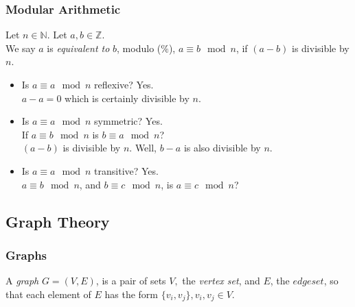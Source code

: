 \documentclass{article}
\newcommand{\N}{\ensuremath{\mathbb{N}}}
\newcommand{\Z}{\ensuremath{\mathbb{Z}}}
\begin{document}
        \subsubsection{Modular Arithmetic}
            \begin{definition}
                Let $n\in \N.$ Let $a,b\in \Z.$ \\
                We say $a$ is \textit{equivalent to} $b$, modulo ($\%$), $a \equiv b \mod{n}$, if $(a-b)$ is divisible by $n$.
            \end{definition}
        
            \begin{itemize}
                \item Is $a \equiv a \mod{n}$ reflexive? Yes. \\
                $a - a = 0$ which is certainly divisible by $n$.
                \item Is $a \equiv a \mod{n}$ symmetric? Yes. \\
                If $a\equiv b\mod{n}$ is $b\equiv a\mod{n}$? \\
                $(a-b)$ is divisible by $n$. Well, $b-a$ is also divisible by $n$.
                \item Is $a \equiv a \mod{n}$ transitive? Yes. \\
                $a\equiv b\mod{n}$, and $b\equiv c \mod{n}$, is $a \equiv c \mod{n}$? \\
            \end{itemize}

\newpage


\setcounter{subsection}{5}
    \subsection{Graph Theory}
        \subsubsection{Graphs}

            \begin{definition}
                A \textit{graph} $G=(V,E)$, is a pair of sets $V,$ the \textit{vertex set}, and $E$, the $edge set$, so that each element of $E$ has the form $\{v_i,v_j\}, v_i,v_j \in V$.
            \end{definition}
        
\end{document}
